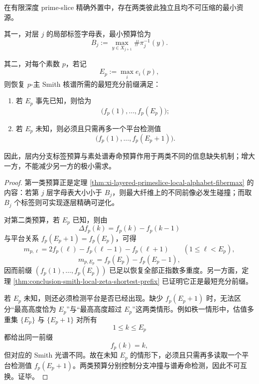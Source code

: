 \begin{theorem}\label{thm:conclusion-local-alphabet-budget-smith-prefix-budget-nonexchangeability}
在有限深度 prime-slice 精确外置中，存在两类彼此独立且均不可压缩的最小资源。

其一，对层 \(j\) 的局部标签字母表，最小预算恰为
\[
B_j:=\max_{y\in X_{j+1}}\#\pi_j^{-1}(y).
\]

其二，对每个素数 \(p\)，若记
\[
E_p:=\max_i e_i(p),
\]
则恢复 \(p\)-主 Smith 核谱所需的最短充分前缀满足：
\begin{enumerate}
  \item 若 \(E_p\) 事先已知，则恰为
  \[
  \bigl(f_p(1),\dots,f_p(E_p)\bigr);
  \]
  \item 若 \(E_p\) 未知，则必须且只需再多一个平台检测值
  \[
  \bigl(f_p(1),\dots,f_p(E_p+1)\bigr).
  \]
\end{enumerate}
因此，层内分支标签预算与素处谱寿命预算作用于两类不同的信息缺失机制；增大一方，不能减少另一方的极小需求。
\end{theorem}
\begin{proof}
第一类预算正是定理 \ref{thm:xi-layered-primeslice-local-alphabet-fibermax} 的内容：若第 \(j\) 层字母表大小小于 \(B_j\)，则最大纤维上的不同前像必发生碰撞；而取 \(B_j\) 个标签则可实现逐层精确可逆化。

对第二类预算，若 \(E_p\) 已知，则由
\[
\Delta f_p(k)=f_p(k)-f_p(k-1)
\]
与平台关系 \(f_p(E_p+1)=f_p(E_p)\)，可得
\[
m_{p,\ell}=2f_p(\ell)-f_p(\ell-1)-f_p(\ell+1)
\qquad (1\le \ell<E_p),
\]
\[
m_{p,E_p}=f_p(E_p)-f_p(E_p-1),
\]
因而前缀 \((f_p(1),\dots,f_p(E_p))\) 已足以恢复全部正指数多重度。另一方面，定理 \ref{thm:conclusion-smith-local-zeta-shortest-prefix} 已证明它正是最短充分前缀。

若 \(E_p\) 未知，则还必须检测平台是否已经出现。缺少 \(f_p(E_p+1)\) 时，无法区分“最高高度恰为 \(E_p\)”与“最高高度超过 \(E_p\)”这两类情形。例如秩一情形中，估值多重集 \(\{E_p\}\) 与 \(\{E_p+1\}\) 对所有
\[
1\le k\le E_p
\]
都给出同一前缀
\[
f_p(k)=k,
\]
但对应的 Smith 光谱不同。故在未知 \(E_p\) 的情形下，必须且只需再多读取一个平台检测值 \(f_p(E_p+1)\)。两类预算分别控制分支冲撞与谱寿命检测，因此不可互换。证毕。
\end{proof}

